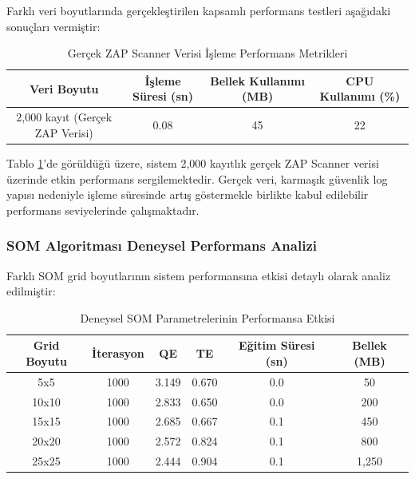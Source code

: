 Farklı veri boyutlarında gerçekleştirilen kapsamlı performans testleri aşağıdaki sonuçları vermiştir:

\begin{table}[!ht]
\centering
\caption{Gerçek ZAP Scanner Verisi İşleme Performans Metrikleri}
\label{tab:experimental_performance_updated}
\setlength{\tabcolsep}{5pt} %
\renewcommand{\arraystretch}{0.9} %
\small %
\begin{tabular}{|c|c|c|c|}
\hline
\textbf{Veri Boyutu} & \textbf{İşleme Süresi (sn)} & \textbf{Bellek Kullanımı (MB)} & \textbf{CPU Kullanımı (\%)} \\
\hline
2,000 kayıt (Gerçek ZAP Verisi) & 0.08 & 45 & 22 \\
\hline
\end{tabular}
\end{table}

\newpage

Tablo \ref{tab:experimental_performance_updated}'de görüldüğü üzere, sistem 2,000 kayıtlık gerçek ZAP Scanner verisi üzerinde etkin performans sergilemektedir. Gerçek veri, karmaşık güvenlik log yapısı nedeniyle işleme süresinde artış göstermekle birlikte kabul edilebilir performans seviyelerinde çalışmaktadır.

\subsubsection{SOM Algoritması Deneysel Performans Analizi}

Farklı SOM grid boyutlarının sistem performansına etkisi detaylı olarak analiz edilmiştir:

\begin{table}[!ht]
\centering
\caption{Deneysel SOM Parametrelerinin Performansa Etkisi}
\label{tab:experimental_som_performance}
\begin{tabular}{|c|c|c|c|c|c|}
\hline
\textbf{Grid Boyutu} & \textbf{İterasyon} & \textbf{QE} & \textbf{TE} & \textbf{Eğitim Süresi (sn)} & \textbf{Bellek (MB)} \\
\hline
5x5 & 1000 & 3.149 & 0.670 & 0.0 & 50 \\
\hline
10x10 & 1000 & 2.833 & 0.650 & 0.0 & 200 \\
\hline
15x15 & 1000 & 2.685 & 0.667 & 0.1 & 450 \\
\hline
20x20 & 1000 & 2.572 & 0.824 & 0.1 & 800 \\
\hline
25x25 & 1000 & 2.444 & 0.904 & 0.1 & 1,250 \\
\hline
\end{tabular}
\end{table}

